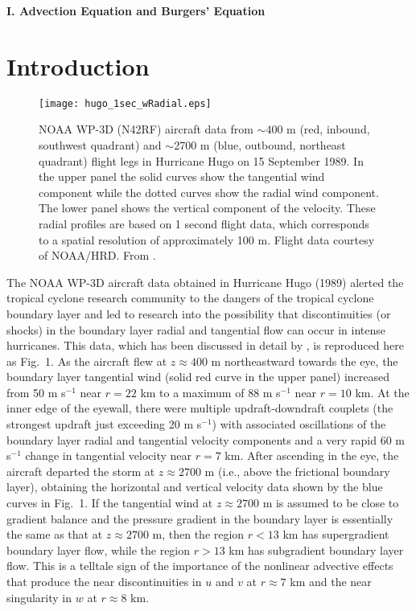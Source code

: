 \documentclass[10pt]{article}
\begin{document}
\newpage

\centerline{\bf I. Advection Equation and Burgers' Equation}

\section{Introduction}                         %

\begin{figure*}[t]                                  %
\centerline{\texttt{[image: hugo\_1sec\_wRadial.eps]}}
\caption{NOAA WP-3D (N42RF) aircraft data from $\sim$400 m (red, inbound,
southwest quadrant) and $\sim$2700 m (blue, outbound, northeast quadrant)
flight legs in Hurricane Hugo on 15 September 1989. In the upper panel
the solid curves show the tangential wind component
while the dotted curves show the radial wind component. The lower
panel shows the vertical component of the velocity. These radial
profiles are based on 1 second flight data, which corresponds to a spatial
resolution of approximately 100 m. Flight data courtesy of NOAA/HRD. From \citet{williams13}.}
\end{figure*}

     The NOAA WP-3D aircraft data obtained in Hurricane Hugo (1989) alerted
the tropical cyclone research community to the dangers of the tropical cyclone
boundary layer and led to research into the possibility that discontinuities
(or shocks) in the boundary layer radial and tangential flow can occur in intense
hurricanes. This data, which has been discussed in detail by \citet{marks08}, is
reproduced here as Fig.~1. As the aircraft flew at $z\approx400$ m northeastward
towards the eye, the boundary layer tangential wind (solid red curve in the
upper panel) increased from 50 m s$^{-1}$ near $r=22$ km to a maximum of
88 m s$^{-1}$ near $r=10$ km.
At the inner edge of the eyewall, there were multiple updraft-downdraft couplets
(the strongest updraft just exceeding 20 m s$^{-1}$) with associated oscillations
of the boundary layer radial and tangential velocity components and a very rapid
60 m s$^{-1}$ change in tangential velocity near $r=7$ km. After ascending in
the eye, the aircraft departed the storm at $z\approx2700$ m (i.e., above the frictional
boundary layer), obtaining the horizontal and vertical velocity data shown by
the blue curves in Fig.~1. If the tangential wind at $z\approx2700$ m is assumed to
be close to gradient balance and the pressure gradient in the boundary layer
is essentially the same as that at $z\approx2700$ m, then the region $r<13$ km has
supergradient boundary layer flow, while the region $r>13$ km has subgradient
boundary layer flow. This is a telltale sign of the importance of the nonlinear
advective effects that produce the near discontinuities in $u$ and $v$ at
$r \approx 7$ km and the near singularity in $w$ at $r \approx 8$ km.
\end{document}
